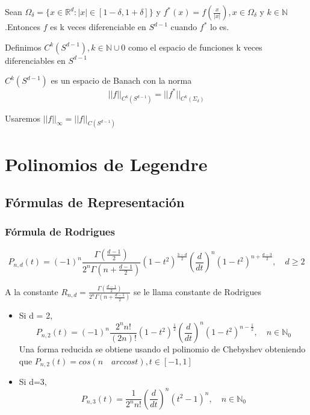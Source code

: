 \begin{prop}Sean $\Omega_\delta = \{x\in\mathds{R}^d : |x|\in[1-\delta,1+\delta]\}$ y $f^*(x)= f(\frac{x}{|x|}),x\in\Omega_\delta$ y $k\in\mathds{N}$.Entonces $f$ es k veces diferenciable en $S^{d-1}$ cuando $f^*$ lo es.  
\end{prop}
\begin{defn}Definimos $C^k(S^{d-1}), k\in\mathds{N}\cup0$ como el espacio de funciones k veces diferenciables en $S^{d-1}$
\end{defn}
\begin{prop}$C^k(S^{d-1})$ es un espacio de Banach con la norma 
	$$
	||f||_{C^k(S^{d-1})} = ||f^*||_{C^k(\Sigma_\delta)}
	$$
\end{prop}
\begin{rem}Usaremos $||f||_\infty = ||f||_{C(S^{d-1})}$
	
\end{rem}
\chapter{Polinomios de Legendre}\label{aped.C}
\section{Fórmulas de Representación}
\subsection{Fórmula de Rodrigues}
\begin{thm}
	$$P_{n,d}(t) = (-1)^n \frac{\Gamma(\frac{d-1}{2}) }{2^n\Gamma(n+\frac{d-1}{2})}(1-t^2)^{\frac{3-d}{2}}(\frac{d}{dt})^n (1-t^2)^{n+\frac{d-3}{2}}, \quad d\ge2
	$$
\end{thm}
\begin{rem}\label{cte_Rod}
	A la constante $R_{n,d} = \frac{\Gamma(\frac{d-1}{2})}{2^n\Gamma(n+\frac{d-1}{2})}$ se le llama constante de Rodrigues
\end{rem}
\begin{example}
	\begin{itemize}
		\item Si d = 2, $$P_{n,2}(t) = (-1)^n \frac{2^n n!} {(2n)!}(1-t^2)^{\frac{1}{2}}(\frac{d}{dt})^n (1-t^2)^{n-\frac{1}{2}}, \quad n\in \mathds{N}_0$$ Una forma reducida se obtiene usando el polinomio de Chebyshev obteniendo que $P_{n,2}(t) = cos(n \quad arccos t), t\in[-1,1]$
		\item Si d=3, $$P_{n,3}(t) = \frac{1} {2^n n!}(\frac{d}{dt})^n (t^2-1)^{n}, \quad n\in \mathds{N}_0$$
	\end{itemize}
\end{example}
